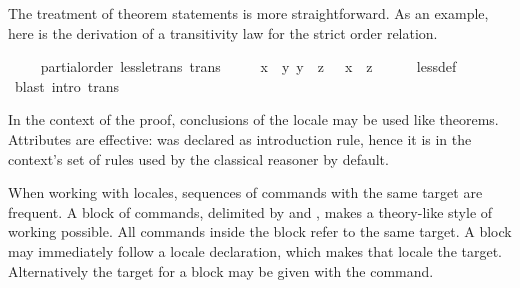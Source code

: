 \begin{isabellebody}
\begin{isamarkuptext}
\end{isamarkuptext}%
\isamarkuptrue%
%
\begin{isamarkuptext}%
The treatment of theorem statements is more straightforward.
  As an example, here is the derivation of a transitivity law for the
  strict order relation.%
\end{isamarkuptext}%
\isamarkuptrue%
\ \ \isamarkupfalse%
\ {}\ partial{}order{}\ less{}le{}trans\ {}trans{}{}\isanewline
\ \ \ \ {}{}\ x\ {}\ y{}\ y\ {}\ z\ {}\ {}\ x\ {}\ z{}\isanewline
%
\isadelimvisible
\ \ \ \ %
\endisadelimvisible
%
\isatagvisible
{}\isamarkupfalse%
\ less{}def\ \isamarkupfalse%
\ {}blast\ intro{}\ trans{}%
\endisatagvisible
{\isafoldvisible}%
%
\isadelimvisible
%
\endisadelimvisible
%
\begin{isamarkuptext}%
In the context of the proof, conclusions of the
  locale may be used like theorems.  Attributes are effective:  was
  declared as introduction rule, hence it is in the context's set of
  rules used by the classical reasoner by default.%
\end{isamarkuptext}%
\isamarkuptrue%
%
\isamarkuptrue%
%
\begin{isamarkuptext}%
When working with locales, sequences of commands with the same
  target are frequent.  A block of commands, delimited by
   and , makes a theory-like style
  of working possible.  All commands inside the block refer to the
  same target.  A block may immediately follow a locale
  declaration, which makes that locale the target.  Alternatively the
  target for a block may be given with the 
  command.


\end{isamarkuptext}
\end{isabellebody}
